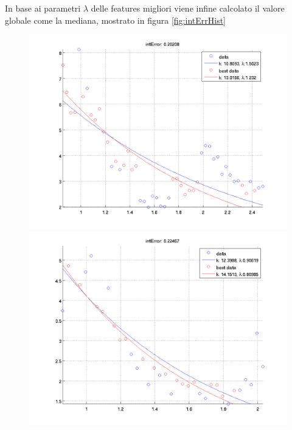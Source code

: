 \documentclass[12pt]{report}
\begin{document}
\noindent In base ai parametri $\lambda$ delle features migliori viene infine calcolato il valore globale come la mediana, mostrato in figura \ref{fig:intErrHist}

\newcommand{\imFeatBW}{.45}
\begin{figure}[H]
\begin{minipage}[t]{0.5\linewidth}
	\centering
	\includegraphics[scale=\imFeatBW]{images/best1}\\
	\includegraphics[scale=\imFeatBW]{images/best3}\\

\end{minipage}
\end{figure}
\end{document}
